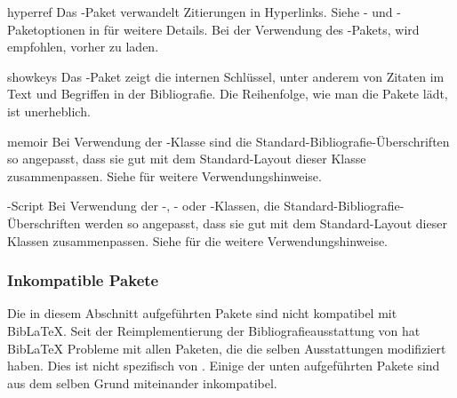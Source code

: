 \documentclass{ltxdockit}[2011/03/25]
\newcommand*{\biblatex}{BibLaTeX\xspace}
\begin{document}
\begin{marglist}

\item[hyperref] Das -Paket verwandelt Zitierungen in Hyperlinks.
Siehe - und -Paketoptionen in 
für weitere Details. Bei der Verwendung des -Pakets, wird empfohlen,
vorher  zu laden. 

\item[showkeys] Das -Paket zeigt die internen Schlüssel, unter
anderem von Zitaten im Text und Begriffen in der Bibliografie. Die Reihenfolge,
wie man die Pakete lädt, ist unerheblich. 

\item[memoir] Bei Verwendung der -Klasse sind die
Standard-Bibliografie-Überschriften so angepasst, dass sie gut mit dem
Standard-Layout dieser Klasse zusammenpassen. Siehe  für
weitere Verwendungshinweise. 

\item[\acr{KOMA}-Script] Bei Verwendung der -, - oder
-Klassen, die Standard-Bibliografie-Überschriften werden so
angepasst, dass sie gut mit dem Standard-Layout dieser Klassen zusammenpassen.
Siehe  für die weitere Verwendungshinweise. 

\end{marglist}

\subsubsection{Inkompatible Pakete } \label{int:pre:inc}

Die in diesem Abschnitt aufgeführten Pakete sind nicht kompatibel mit \biblatex. Seit
der Reimplementierung der Bibliografieausstattung von \latex hat \biblatex
Probleme mit allen Paketen, die die selben Ausstattungen modifiziert haben. Dies
ist nicht spezifisch von . Einige der unten aufgeführten Pakete
sind aus dem selben Grund miteinander inkompatibel. 
\end{document}
